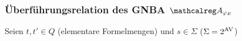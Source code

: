 \begin{frame}
      \par\bigskip

    \end{frame}

    \begin{frame}
      \frametitle{Überführungsrelation des GNBA $\Aut{A}_{\varphi_E}$}

      Seien $t,t' \in Q$ (elementare Formelmengen) und $s \in \Sigma$ ($\Sigma = 2^\textup{AV}$)


\end{frame}
